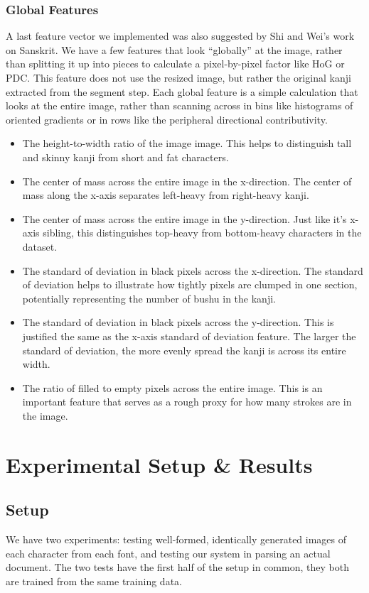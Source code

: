 \documentclass[10pt,twocolumn,letterpaper]{article}
\begin{document}
\subsubsection{Global Features}

A last feature vector we implemented was also suggested by Shi and Wei’s work on Sanskrit. We have a few features that look ``globally'' at the image, rather than splitting it up into pieces to calculate a pixel-by-pixel factor like HoG or PDC. This feature does not use the resized image, but rather the original kanji extracted from the segment step. Each global feature is a simple calculation that looks at the entire image, rather than scanning across in bins like histograms of oriented gradients or in rows like the peripheral directional contributivity.

\begin{itemize}
    \item The height-to-width ratio of the image image. This helps to distinguish tall and skinny kanji from short and fat characters.
    \item The center of mass across the entire image in the x-direction. The center of mass along the x-axis separates left-heavy from right-heavy kanji.
    \item The center of mass across the entire image in the y-direction. Just like it’s x-axis sibling, this distinguishes top-heavy from bottom-heavy characters in the dataset.
    \item The standard of deviation in black pixels across the x-direction. The standard of deviation helps to illustrate how tightly pixels are clumped in one section, potentially representing the number of bushu in the kanji.
    \item The standard of deviation in black pixels across the y-direction. This is justified the same as the x-axis standard of deviation feature. The larger the standard of deviation, the more evenly spread the kanji is across its entire width.
    \item The ratio of filled to empty pixels across the entire image. This is an important feature that serves as a rough proxy for how many strokes are in the image.
\end{itemize}

\section{Experimental Setup \& Results}
\subsection{Setup}
We have two experiments: testing well-formed, identically generated images of each character from each font, and testing our system in parsing an actual document. The two tests have the first half of the setup in common, they both are trained from the same training data.
\end{document}
